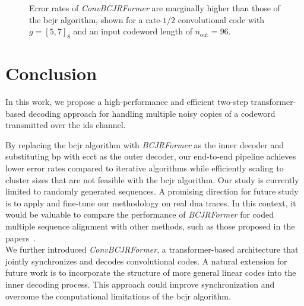 \documentclass[conference,letterpaperu]{IEEEtran}
\newcommand{\psub}{\ensuremath{p_S}}
\newcommand{\nout}{\ensuremath{n_{\text{out}}}}
\begin{document}
\begin{figure}[t]
      \caption{Error rates of \textit{ConvBCJRFormer} are marginally higher than those of the \ac{bcjr} algorithm, shown for a rate-$1/2$ convolutional code with $g = [5, 7]_8$ and an input codeword length of $\nout = 96$.}
      \label{fig:ConvBCJRFormer}
\end{figure}
\section{Conclusion}
In this work, we propose a high-performance and efficient two-step transformer-based decoding approach for handling multiple noisy copies of a codeword transmitted over the \ac{ids} channel.

By replacing the \ac{bcjr} algorithm with \textit{BCJRFormer} as the inner decoder and substituting \ac{bp} with \ac{ecct} as the outer decoder, our end-to-end pipeline achieves lower error rates compared to iterative algorithms while efficiently scaling to cluster sizes that are not feasible with the \ac{bcjr} algorithm. Our study is currently limited to randomly generated sequences. A promising direction for future study is to apply and fine-tune our methodology on real \ac{dna} traces. In this context, it would be valuable to compare the performance of \textit{BCJRFormer} for coded multiple sequence alignment with other methods, such as those proposed in the papers~\cite{srinivasavaradhanTrellisBMACoded2021, maaroufConcatenatedCodesMultiple2023a}. \\
We further introduced \textit{ConvBCJRFormer}, a transformer-based architecture that jointly synchronizes and decodes convolutional codes. A natural extension for future work is to incorporate the structure of more general linear codes into the inner decoding process. This approach could improve synchronization and overcome the computational limitations of the \ac{bcjr} algorithm.   
\newpage
{}

\end{document}
